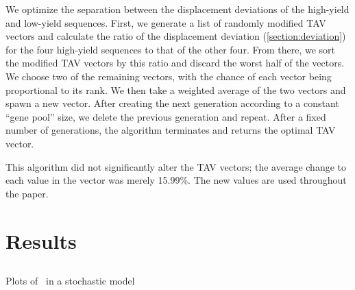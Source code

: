 \documentclass[12pt]{article}
\begin{document}
We optimize the separation between the displacement deviations of the 
high-yield and low-yield sequences. First, we generate a list of 
randomly modified TAV vectors and calculate the ratio of the 
displacement deviation (\autoref{section:deviation}) for the four 
high-yield sequences to that of the other four. From there, we sort the 
modified TAV vectors by this ratio and discard the worst half of the 
vectors. We choose two of the remaining vectors, with the chance 
of each vector being proportional to its rank.  We then take a weighted 
average of the two vectors and spawn a new vector.  After creating the 
next generation according to a constant ``gene pool'' size, we delete 
the previous generation  and repeat. After a fixed number of 
generations, the algorithm terminates and returns the optimal TAV vector.

This algorithm did not significantly alter the TAV vectors; the average 
change to each value in the vector was merely 15.99\%.  The new values
are used throughout the paper.

\section{Results}
\subsection{\prfB}

\begin{cfigure}
  \caption{Plots of \prfB\ in a stochastic model}
  \label{prfB:stochplots}
\end{cfigure}
\end{document}
